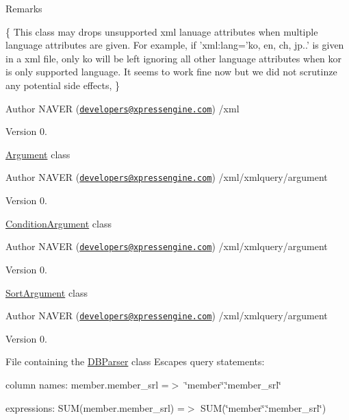 \begin{DoxyItemize}
\begin{DoxyRemark}{Remarks}
\begin{DoxyPre}\{ 
This class may drops unsupported xml lanuage attributes when multiple language attributes are given.
For example, if 'xml:lang='ko, en, ch, jp..' is given in a xml file, only ko will be left ignoring all other language
attributes when kor is only supported language. It seems to work fine now but we did not scrutinze any potential side effects,
\}\end{DoxyPre}

\end{DoxyRemark}
\begin{DoxyAuthor}{Author}
N\+A\+V\+E\+R (\href{mailto:developers@xpressengine.com}{\tt developers@xpressengine.\+com}) /xml 
\end{DoxyAuthor}
\begin{DoxyVersion}{Version}
0.
\end{DoxyVersion}
\hyperlink{classArgument}{Argument} class \begin{DoxyAuthor}{Author}
N\+A\+V\+E\+R (\href{mailto:developers@xpressengine.com}{\tt developers@xpressengine.\+com}) /xml/xmlquery/argument 
\end{DoxyAuthor}
\begin{DoxyVersion}{Version}
0.
\end{DoxyVersion}
\hyperlink{classConditionArgument}{Condition\+Argument} class \begin{DoxyAuthor}{Author}
N\+A\+V\+E\+R (\href{mailto:developers@xpressengine.com}{\tt developers@xpressengine.\+com}) /xml/xmlquery/argument 
\end{DoxyAuthor}
\begin{DoxyVersion}{Version}
0.
\end{DoxyVersion}
\hyperlink{classSortArgument}{Sort\+Argument} class \begin{DoxyAuthor}{Author}
N\+A\+V\+E\+R (\href{mailto:developers@xpressengine.com}{\tt developers@xpressengine.\+com}) /xml/xmlquery/argument 
\end{DoxyAuthor}
\begin{DoxyVersion}{Version}
0.
\end{DoxyVersion}
File containing the \hyperlink{classDBParser}{D\+B\+Parser} class Escapes query statements\+: ~\newline

\begin{DoxyItemize}
\item column names\+: member.\+member\+\_\+srl =$>$ \char`\"{}member\char`\"{}.\char`\"{}member\+\_\+srl\char`\"{} ~\newline

\item expressions\+: S\+U\+M(member.\+member\+\_\+srl) =$>$ S\+U\+M(\char`\"{}member\char`\"{}.\char`\"{}member\+\_\+srl\char`\"{}) ~\newline

\end{DoxyItemize}
\end{DoxyItemize}

